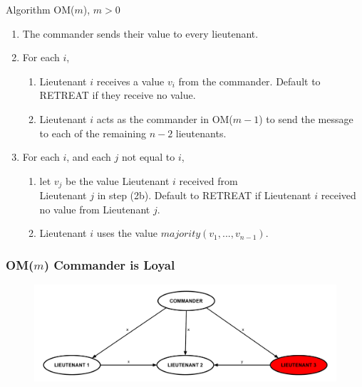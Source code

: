 \documentclass{beamer}
\theoremstyle{conjecture1}
\theoremstyle{conjecture2}
\begin{document}
\begin{frame}
    \begin{block}{Algorithm OM($m$), $m>0$}
        \begin{enumerate}[label=\arabic{enumi}.]
            \item<1-> The commander sends their value to every lieutenant.
            \item<2-> For each $i$,
            \begin{enumerate}[label={\alph*.}]
                \item<3-> {
                    Lieutenant $i$ receives a value $v_i$ from the commander. Default to RETREAT if they receive
                    no value.
                }
                \item<4-> {
                    Lieutenant $i$ acts as the commander in OM($m-1$) to send the message to each of the remaining
                    $n-2$ lieutenants.
                }
            \end{enumerate}
            \item<5-> For each $i$, and each $j$ not equal to $i$,
            \begin{enumerate}[label={\alph*.}]
                \item<6-> {
                    let $v_j$ be the value Lieutenant $i$ received from \\ Lieutenant $j$ in step (2b). Default to 
                    RETREAT if Lieutenant $i$ received no value from Lieutenant $j$.
                }
                \item<7-> Lieutenant $i$ uses the value $majority(v_1,...,v_{n-1})$.
            \end{enumerate}  
        \end{enumerate} 
    \end{block}
\end{frame}

\begin{frame}
    \frametitle{OM($m$) Commander is Loyal}
    \begin{figure}
        \centering
        \includegraphics[scale=.32]{../figures/oral_messages_OM(1)_loyal_commander.pdf}
    \end{figure}
\end{frame}
\end{document}

